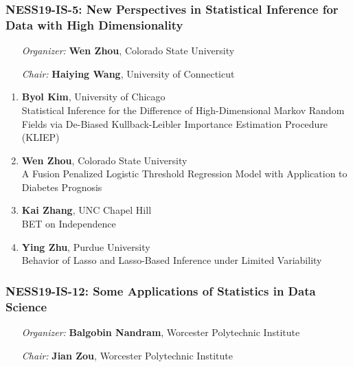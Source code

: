 \subsubsection*{NESS19-IS-5: New Perspectives in Statistical Inference for Data with High Dimensionality}

\begin{enumerate}[align=left]
\item [\emph{Organizer:}] \textbf{Wen Zhou}, Colorado State University
\item [\emph{Chair:}] \textbf{Haiying Wang},  University of Connecticut
\end{enumerate}

\begin{enumerate}
\item \textbf{Byol Kim}, University of Chicago \\
Statistical Inference for the Difference of High-Dimensional Markov Random Fields via De-Biased Kullback-Leibler Importance Estimation Procedure (KLIEP)
\item \textbf{Wen Zhou}, Colorado State University \\
A Fusion Penalized Logistic Threshold Regression Model with Application to Diabetes Prognosis
\item \textbf{Kai Zhang}, UNC Chapel Hill \\
BET on Independence
\item \textbf{Ying Zhu}, Purdue University \\
Behavior of Lasso and Lasso-Based Inference under Limited Variability
\end{enumerate}

\subsubsection*{NESS19-IS-12: Some Applications of Statistics in Data Science}

\begin{enumerate}[align=left]
\item [\emph{Organizer:}] \textbf{Balgobin Nandram}, Worcester Polytechnic Institute
\item [\emph{Chair:}] \textbf{Jian Zou},  Worcester Polytechnic Institute
\end{enumerate}

